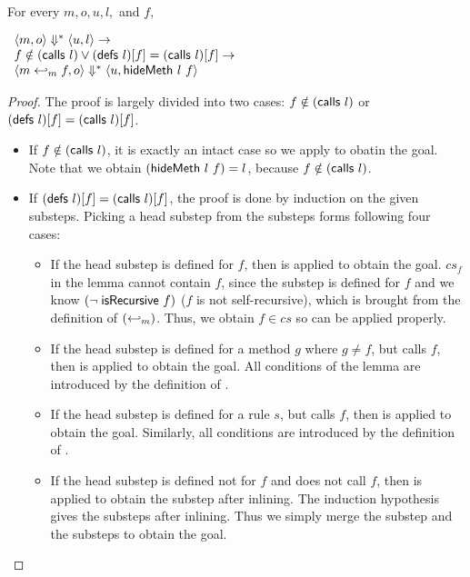 \begin{lemma}
  \label{lem-inlinedmm}
  \mbox{}\\
  For every $m, o, u, l,$ and $f,$
  \begin{center}
    \begin{math}
      \begin{array}{l}
        \langle m, o \rangle \Downarrow^{\ast} \langle u, l \rangle \to \\
        f \notin (\textsf{calls}\ l) \vee (\textsf{defs}\ l)[f] = (\textsf{calls}\ l)[f] \to \\
        \langle m \hookleftarrow_{m}{} f, o \rangle \Downarrow^{\ast} \langle u, \textsf{hideMeth}{}\ l\ f \rangle
      \end{array}
    \end{math}
  \end{center}
\end{lemma}
\begin{proof}
  The proof is largely divided into two cases: $f \notin
  (\textsf{calls}\ l)$ or $(\textsf{defs}\ l)[f] = (\textsf{calls}\ l)[f]$.
  \begin{itemize}
  \item If $f \notin (\textsf{calls}\ l)$, it is exactly an intact case so
    we apply  to obatin the goal. Note
    that we obtain $(\textsf{hideMeth}{}\ l\ f) = l$, because $f \notin
    (\textsf{calls}\ l)$.
  \item If $(\textsf{defs}\ l)[f] = (\textsf{calls}\ l)[f]$, the proof is done by
    induction on the given substeps. Picking a head substep from the
    substeps forms following four cases:
    \begin{itemize}
    \item If the head substep is defined for $f$, then
       is applied to obtain the
      goal. $cs_f$ in the lemma cannot contain $f$, since the substep
      is defined for $f$ and we know $(\neg\; \textsf{isRecursive}\ f)$ ($f$ is not
      self-recursive), which is brought from the definition of
      $(\hookleftarrow_{m})$.  Thus, we obtain $f \in cs$ so
       can be applied properly.
    \item If the head substep is defined for a method $g$ where $g
      \neq f$, but calls $f$, then  is
      applied to obtain the goal. All conditions of the lemma are
      introduced by the definition of \Substeps{}.
    \item If the head substep is defined for a rule $s$, but calls
      $f$, then  is applied to obtain the
      goal. Similarly, all conditions are introduced by the definition
      of \Substeps{}.
    \item If the head substep is defined not for $f$ and does not call
      $f$, then  is applied to
      obtain the substep after inlining. The induction hypothesis gives
      the substeps after inlining. Thus we simply merge the substep
      and the substeps to obtain the goal.
    \end{itemize}
  \end{itemize}
\end{proof}

